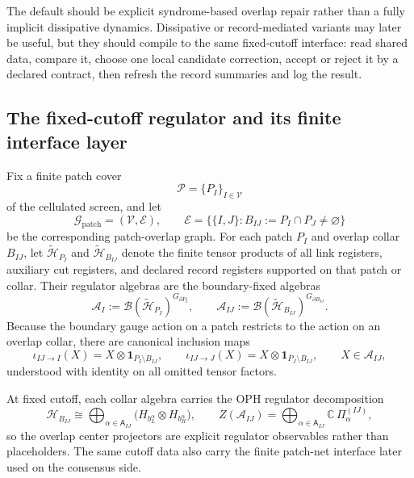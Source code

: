 \documentclass[11pt]{article}
\begin{document}
The default should be explicit syndrome-based overlap repair rather than a fully
implicit dissipative dynamics. Dissipative or record-mediated variants may later be useful, but
they should compile to the same fixed-cutoff interface: read shared data, compare it, choose one
local candidate correction, accept or reject it by a declared contract, then refresh the record
summaries and log the result.

\subsection{The fixed-cutoff regulator and its finite interface layer}

Fix a finite patch cover
\begin{equation}
\mathcal P=\{P_I\}_{I\in\mathcal V}
\end{equation}
of the cellulated screen, and let
\begin{equation}
\mathcal G_{\mathrm{patch}}=(\mathcal V,\mathcal E),
\qquad
\mathcal E=\bigl\{\{I,J\}: B_{IJ}:=P_I\cap P_J\neq \varnothing\bigr\}
\end{equation}
be the corresponding patch-overlap graph. For each patch $P_I$ and overlap collar $B_{IJ}$, let
$\widetilde{\mathcal H}_{P_I}$ and $\widetilde{\mathcal H}_{B_{IJ}}$ denote the finite tensor
products of all link registers, auxiliary cut registers, and declared record registers supported
on that patch or collar. Their regulator algebras are the boundary-fixed algebras
\begin{equation}
\mathcal A_I:=\mathcal B(\widetilde{\mathcal H}_{P_I})^{G_{\partial P_I}},
\qquad
\mathcal A_{IJ}:=\mathcal B(\widetilde{\mathcal H}_{B_{IJ}})^{G_{\partial B_{IJ}}}.
\end{equation}
Because the boundary gauge action on a patch restricts to the action on an overlap collar, there
are canonical inclusion maps
\begin{equation}
\iota_{IJ\to I}(X)=X\otimes \mathbf 1_{P_I\setminus B_{IJ}},
\qquad
\iota_{IJ\to J}(X)=X\otimes \mathbf 1_{P_J\setminus B_{IJ}},
\qquad
X\in \mathcal A_{IJ},
\end{equation}
understood with identity on all omitted tensor factors.

At fixed cutoff, each collar algebra carries the OPH regulator decomposition
\begin{equation}
\mathcal H_{B_{IJ}}
\cong
\bigoplus_{\alpha\in\mathsf A_{IJ}}
\bigl(H_{b_L^\alpha}\otimes H_{b_R^\alpha}\bigr),
\qquad
Z(\mathcal A_{IJ})
=
\bigoplus_{\alpha\in\mathsf A_{IJ}}\mathbb C\,\Pi_\alpha^{(IJ)},
\end{equation}
so the overlap center projectors are explicit regulator observables rather than
placeholders. The same cutoff data also carry the finite patch-net interface later used on the
consensus side.
\end{document}
